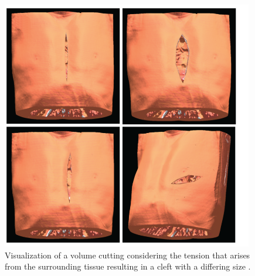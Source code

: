 \begin{figure} [htb!]
    \centering
	\includegraphics[width=11cm]{content/images/physical}
	\caption{Visualization of a volume cutting considering the tension that arises from the surrounding tissue resulting in a cleft with a differing size \cite{Nakao2010}.} 
	\label{fig:physical}
\end{figure}